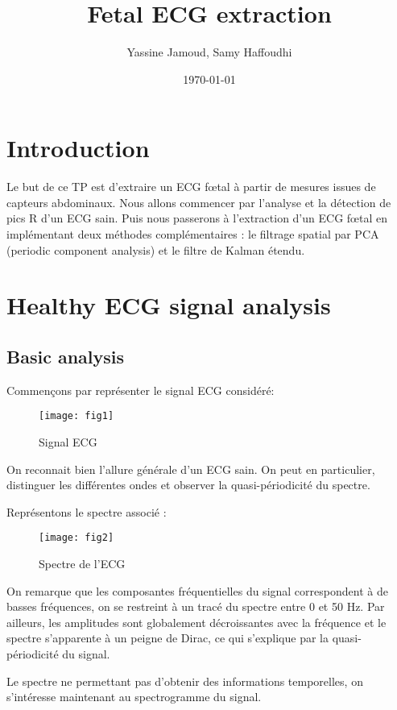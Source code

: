 \documentclass[12pt,a4paper,titlepage]{article}
\title{Fetal ECG extraction}
\author{Yassine Jamoud, Samy Haffoudhi}
\date{\today}
\begin{document}
\maketitle

\section*{Introduction}

Le but de ce TP est d'extraire un ECG fœtal à partir de mesures issues de capteurs abdominaux.
Nous allons commencer par l'analyse et la détection de pics R d'un ECG sain. Puis nous 
passerons à l'extraction d'un ECG fœtal en implémentant deux méthodes complémentaires : 
le filtrage spatial par PCA (periodic component analysis) et le filtre de Kalman étendu.

\section{Healthy ECG signal analysis}

\subsection{Basic analysis}

Commençons par représenter le signal ECG considéré:

\begin{figure}[H]
    \caption{Signal ECG}
    \texttt{[image: fig1]}
    \centering
\end{figure}

On reconnait bien l'allure générale d'un ECG sain. On peut en particulier, distinguer les 
différentes ondes et observer la quasi-périodicité du spectre.

Représentons le spectre associé :

\begin{figure}[H]
    \caption{Spectre de l'ECG}
    \texttt{[image: fig2]}
    \centering
\end{figure}

On remarque que les composantes fréquentielles du signal correspondent à de basses
fréquences, on se restreint à un tracé du spectre entre 0 et 50 Hz. Par ailleurs, les
amplitudes sont globalement décroissantes avec la fréquence et le spectre s'apparente 
à un peigne de Dirac, ce qui s'explique par la quasi-périodicité du signal.

Le spectre ne permettant pas d'obtenir des informations temporelles, on s'intéresse 
maintenant au spectrogramme du signal.
\end{document}
